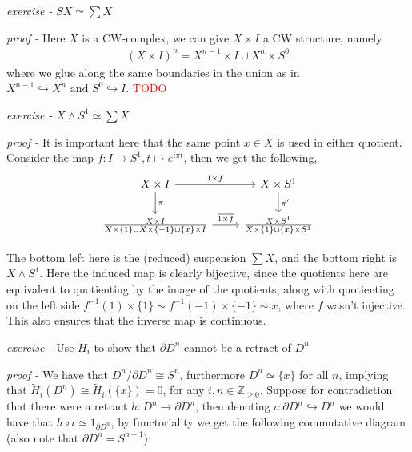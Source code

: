 \documentclass[11pt]{article}
\theoremstyle{definition}
\newcommand{\set}[1]{\{#1\}}
\newcommand{\tand}{\text{ and }}
\begin{document}
    \emph{exercise - }\label{HEx8} \(SX \simeq \sum X\)

    \emph{proof - } Here \(X\) is a CW-complex, we can give \(X \times I\) a CW structure, namely
    \begin{align*}
        (X \times I)^n = X^{n-1} \times I \cup X^n \times S^0
    \end{align*}
    where we glue along the same boundaries in the union as in \(X^{n-1} \hookrightarrow X^n \tand S^0 \hookrightarrow I\). \textcolor{red}{TODO}


    \emph{exercise - }\label{HEx9} \(X \wedge S^1 \simeq \sum X\)

    \emph{proof - } It is important here that the same point \(x \in X\) is used in either quotient. Consider the map \(f: I \to S^1, t \mapsto e^{i\pi t}\), then we get the following,
    \begin{equation*}
        \begin{tikzcd}
            X \times I \arrow[d,"{\pi}"] \arrow[r,"{1 \times f}"] & X \times S^1 \arrow[d,"{\pi'}"] \\
            \frac{X \times I}{X \times \set{1} \cup X \times \set{-1} \cup \set{x}\times I} \arrow[r,"{\overline{1 \times f}}"] &\frac{X \times S^1}{X\times \set{1} \cup \set{x} \times S^1}
        \end{tikzcd}
    \end{equation*}

    The bottom left here is the (reduced) suspension \(\sum X\), and the bottom right is \(X \wedge S^1\). Here the induced map is clearly bijective, since the quotients here are equivalent to quotienting by the image of the quotients, along with quotienting on the left side \(f^{-1}(1) \times \set{1} \sim f^{-1}(-1) \times \set{-1} \sim x\), where \(f\) wasn't injective. This also ensures that the inverse map is continuous.


    \emph{exercise - }\label{HEx10} Use \(\tilde{H_i}\) to show that \(\partial D^n\) cannot be a retract of \(D^n\)

    \emph{proof - } We have that \(D^n/\partial D^n \cong S^n\), furthermore \(D^n \simeq \set{x}\) for all \(n\), implying that \(\tilde{H}_i(D^n) \cong \tilde{H}_i(\set{x}) = 0\), for any \(i,n \in \mathbb{Z}_{\geq 0}\). Suppose for contradiction that there were a retract \(h: D^n \to \partial D^n\), then denoting \(\iota: \partial D^n \hookrightarrow D^n\) we would have that \(h \circ \iota \simeq 1_{\partial D^n}\), by functoriality we get the following commutative diagram (also note that \(\partial D^n = S^{n-1}\)):
\end{document}
